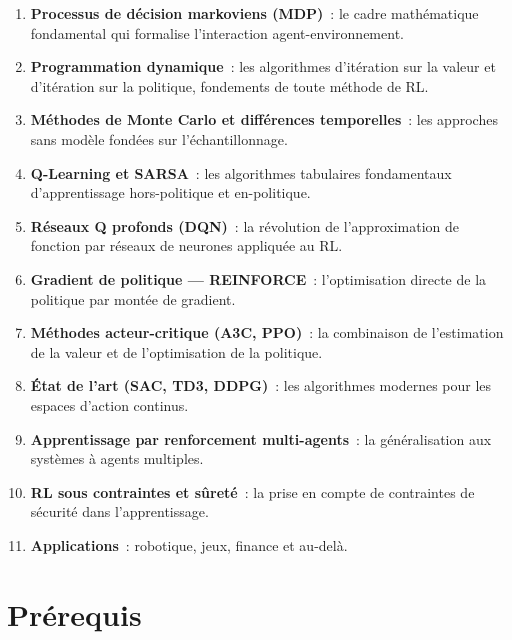 \begin{enumerate}
    \item \textbf{Processus de d\'ecision markoviens (MDP)}~: le cadre math\'ematique
    fondamental qui formalise l'interaction agent-environnement.

    \item \textbf{Programmation dynamique}~: les algorithmes d'it\'eration sur la valeur
    et d'it\'eration sur la politique, fondements de toute m\'ethode de RL.

    \item \textbf{M\'ethodes de Monte Carlo et diff\'erences temporelles}~: les approches
    sans mod\`ele fond\'ees sur l'\'echantillonnage.

    \item \textbf{Q-Learning et SARSA}~: les algorithmes tabulaires fondamentaux
    d'apprentissage hors-politique et en-politique.

    \item \textbf{R\'eseaux Q profonds (DQN)}~: la r\'evolution de l'approximation de
    fonction par r\'eseaux de neurones appliqu\'ee au RL.

    \item \textbf{Gradient de politique --- REINFORCE}~: l'optimisation directe de la
    politique par mont\'ee de gradient.

    \item \textbf{M\'ethodes acteur-critique (A3C, PPO)}~: la combinaison de
    l'estimation de la valeur et de l'optimisation de la politique.

    \item \textbf{\'Etat de l'art (SAC, TD3, DDPG)}~: les algorithmes modernes
    pour les espaces d'action continus.

    \item \textbf{Apprentissage par renforcement multi-agents}~: la g\'en\'eralisation
    aux syst\`emes \`a agents multiples.

    \item \textbf{RL sous contraintes et s\^uret\'e}~: la prise en compte de contraintes
    de s\'ecurit\'e dans l'apprentissage.

    \item \textbf{Applications}~: robotique, jeux, finance et au-del\`a.
\end{enumerate}

\section*{Pr\'erequis}

